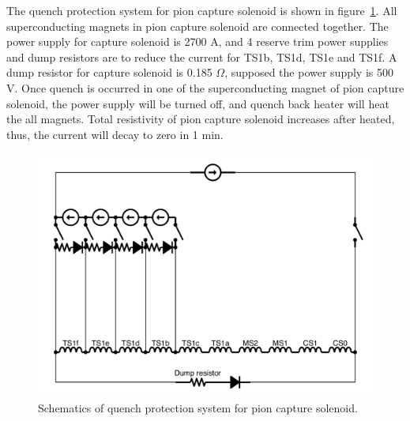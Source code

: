 The quench protection system for pion capture solenoid is shown in figure~\ref{capture}.
All superconducting magnets in pion capture solenoid are connected together.
The power supply for capture solenoid is 2700 A, and 4 reserve trim power supplies and dump resistors are to reduce the current for TS1b, TS1d, TS1e and TS1f.
A dump resistor for capture solenoid is 0.185 $\Omega$, supposed the power supply is 500 V.
Once quench is occurred in one of the superconducting magnet of pion capture solenoid, the power supply will be turned off, and quench back heater will heat the all magnets.
Total resistivity of pion capture solenoid increases after heated, thus, the current will decay to zero in 1 min.
\begin{figure}[H]
 \centering
 \includegraphics[scale=0.4]{chapter2/fig/capture.pdf}
 \caption{Schematics of quench protection system for pion capture solenoid.}
 \label{capture}
\end{figure}

